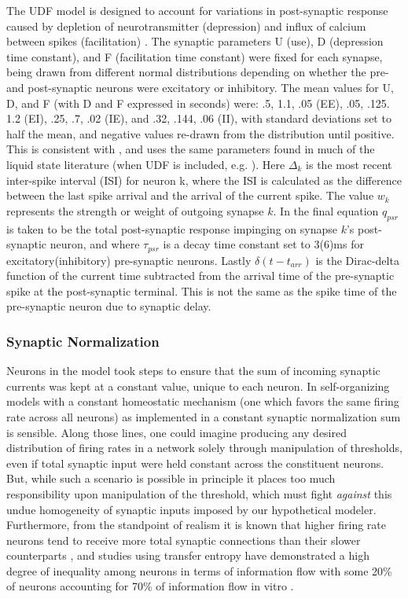 \documentclass[10pt,letterpaper]{article}
\begin{document}
The UDF model is designed to account for variations in post-synaptic response caused by depletion of neurotransmitter (depression) and influx of calcium between spikes (facilitation) \cite{tsodyks2013short}. The synaptic parameters U (use), D (depression time constant), and F (facilitation time constant) were fixed for each synapse, being drawn from different normal distributions depending on whether the pre- and post-synaptic neurons were excitatory or inhibitory. The mean values for U, D, and F (with D and F expressed in seconds) were: .5, 1.1, .05 (EE), .05, .125. 1.2 (EI), .25, .7, .02 (IE), and .32, .144, .06 (II), with standard deviations set to half the mean, and negative values re-drawn from the distribution until positive. This is consistent with \cite{markram1998differential}, and uses the same parameters found in much of the liquid state literature (when UDF is included, e.g. \cite{maass2002real}). Here $\Delta_k$ is the most recent inter-spike interval (ISI) for neuron k, where the ISI is calculated as the difference between the last spike arrival and the arrival of the current spike. The value $w_k$ represents the strength or weight of outgoing synapse $k$. In the final equation $q_{psr}$ is taken to be the total post-synaptic response impinging on synapse $k$'s post-synaptic neuron, and where $\tau_{psr}$ is a decay time constant set to 3(6)ms for excitatory(inhibitory) pre-synaptic neurons. Lastly $\delta(t - t_{arr}) $ is the Dirac-delta function of the current time subtracted from the arrival time of the pre-synaptic spike at the post-synaptic terminal. This is not the same as the spike time of the pre-synaptic neuron due to synaptic delay. 
		
\subsubsection*{Synaptic Normalization}
\label{SN}
	
Neurons in the model took steps to ensure that the sum of incoming synaptic currents was kept at a constant value, unique to each neuron. In self-organizing models with a constant homeostatic mechanism (one which favors the same firing rate across all neurons) as implemented in \cite{lazar2009sorn, zheng2013network, miner2016plasticity} a constant synaptic normalization sum is sensible. Along those lines, one could imagine producing any desired distribution of firing rates in a network solely through manipulation of thresholds, even if total synaptic input were held constant across the constituent neurons. But, while such a scenario is possible in principle it places too much responsibility upon manipulation of the threshold, which must fight \emph{against} this undue homogeneity of synaptic inputs imposed by our hypothetical modeler. Furthermore, from the standpoint of realism it is known that higher firing rate neurons tend to receive more total synaptic connections than their slower counterparts \cite{yassin2010embedded}\cite{benedetti2012differential}, and studies using transfer entropy have demonstrated a high degree of inequality among neurons in terms of information flow with some 20\% of neurons accounting for 70\% of information flow in vitro \cite{nigam2016}. 
\end{document}
